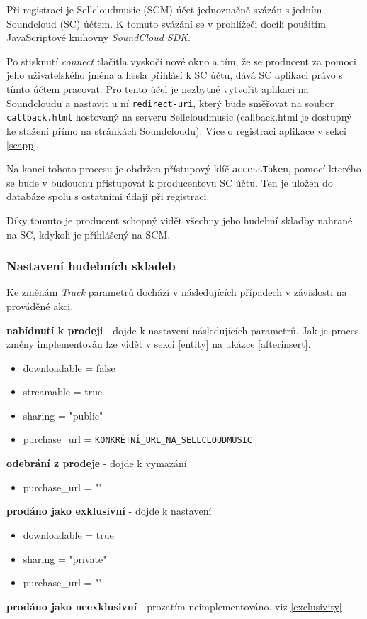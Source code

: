 \documentclass[12pt]{article}
\begin{document}
Při registraci je Sellcloudmusic (SCM) účet jednoznačně svázán s jedním Soundcloud (SC) účtem. K tomuto svázání se v prohlížeči docílí použitím JavaScriptové knihovny \emph{SoundCloud SDK}.

Po stisknutí \emph{connect} tlačítla vyskočí nové okno a tím, že se producent za pomoci jeho uživatelského jména a hesla přihlásí k SC účtu, dává SC aplikaci právo s tímto účtem pracovat. Pro tento účel je nezbytné vytvořit aplikaci na Soundcloudu a nastavit u ní \texttt{redirect-uri}, který bude směřovat na soubor \texttt{callback.html} hostovaný na serveru Sellcloudmusic (callback.html je dostupný ke stažení přímo na stránkách Soundcloudu). Více o registraci aplikace v sekci \ref{scapp}.

Na konci tohoto procesu je obdržen přístupový klíč \texttt{accessToken}, pomocí kterého se bude v budoucnu přistupovat k producentovu SC účtu. Ten je uložen do databáze spolu s ostatními údaji při registraci.

Díky tomuto je producent schopný vidět všechny jeho hudební skladby nahrané na SC, kdykoli je přihlášený na SCM.

\subsubsection{Nastavení hudebních skladeb} \label{scsettrack}

Ke změnám \emph{Track} parametrů dochází v následujících případech v závislosti na prováděné akci.

\begin{description}
\item{\textbf{nabídnutí k prodeji}} - dojde k nastavení následujících parametrů. Jak je proces změny implementován lze vidět v sekci \ref{entity} na ukázce \ref{afterinsert}.
  \begin{itemize}
  \item downloadable = false
  \item streamable = true
  \item sharing = "public"
  \item purchase\_url = \texttt{KONKRÉTNÍ\_URL\_NA\_SELLCLOUDMUSIC}
  \end{itemize}

\item{\textbf{odebrání z prodeje}} - dojde k vymazání
  \begin{itemize}
  \item purchase\_url = ""
  \end{itemize}

\item{\textbf{prodáno jako exklusivní}} - dojde k nastavení
  \begin{itemize}
  \item downloadable = true
  \item sharing = "private"
  \item purchase\_url = ""
  \end{itemize}

\item{\textbf{prodáno jako neexklusivní}} - prozatím neimplementováno. viz \ref{exclusivity}
\end{description}
\end{document}
